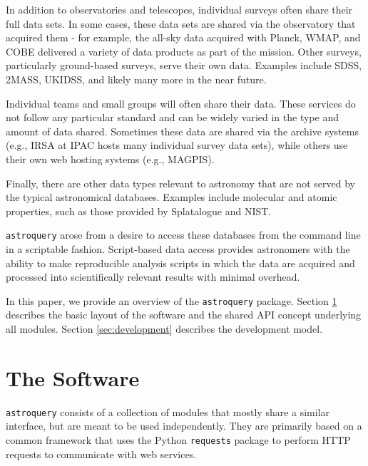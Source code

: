 \documentclass[twocolumn]{aastex61}
\newcommand{\package}[1]{\texttt{#1}\xspace}
\newcommand{\astroquery}{\package{astroquery}}
\begin{document}
In addition to observatories and telescopes, individual surveys often share
their full data sets.  In some cases, these data sets are shared via the
observatory that acquired them - for example, the all-sky data acquired with
Planck, WMAP, and COBE delivered a variety of data products as part of the
mission.  Other surveys, particularly ground-based surveys, serve their own
data.  Examples include SDSS, 2MASS, UKIDSS, and likely many more in the near future.

Individual teams and small groups will often share their data.
These services do not follow any particular standard and can be widely
varied in the type and amount of data shared.  Sometimes these data
are shared via the archive systems (e.g., IRSA at IPAC hosts many
individual survey data sets), while others use their own web hosting
systems (e.g., MAGPIS).

Finally, there are other data types relevant to astronomy that are not
served by the typical astronomical databases.  Examples include molecular
and atomic properties, such as those provided by Splatalogue and NIST.

\astroquery arose from a desire to access these databases from the command line
in a scriptable fashion.  Script-based data access provides astronomers with
the ability to make reproducible analysis scripts in which the data are
acquired and processed into scientifically relevant results with minimal
overhead.

In this paper, we provide an overview of the \astroquery package.
Section \ref{sec:software} describes the basic layout of the software and
the shared API concept underlying all modules.  Section \ref{sec:development}
describes the development model.



\section{The Software}
\label{sec:software}
\astroquery consists of a collection of modules that mostly share a similar
interface, but are meant to be used independently.  They are primarily based on
a common framework that uses the Python \texttt{requests} package to perform
HTTP requests to communicate with web services.
\end{document}
